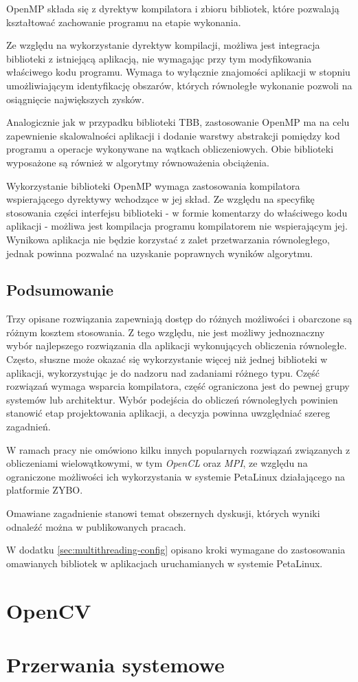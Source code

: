 OpenMP składa się z dyrektyw kompilatora i zbioru bibliotek, które pozwalają kształtować zachowanie programu na etapie wykonania.

Ze względu na wykorzystanie dyrektyw kompilacji, możliwa jest integracja biblioteki z istniejącą aplikacją, nie wymagając przy tym modyfikowania właściwego kodu programu. Wymaga to wyłącznie znajomości aplikacji w stopniu umożliwiającym identyfikację obszarów, których równoległe wykonanie pozwoli na osiągnięcie największych zysków.

Analogicznie jak w przypadku biblioteki TBB, zastosowanie OpenMP ma na celu zapewnienie skalowalności aplikacji i dodanie warstwy abstrakcji pomiędzy kod programu a operacje wykonywane na wątkach obliczeniowych. Obie biblioteki wyposażone są również w algorytmy równoważenia obciążenia.

Wykorzystanie biblioteki OpenMP wymaga zastosowania kompilatora wspierającego dyrektywy wchodzące w jej skład. Ze względu na specyfikę stosowania części interfejsu biblioteki - w formie komentarzy do właściwego kodu aplikacji - możliwa jest kompilacja programu kompilatorem nie wspierającym jej. Wynikowa aplikacja nie będzie korzystać z zalet przetwarzania równoległego, jednak powinna pozwalać na uzyskanie poprawnych wyników algorytmu.

\subsection*{Podsumowanie}
Trzy opisane rozwiązania zapewniają dostęp do różnych możliwości i obarczone są różnym kosztem stosowania. Z tego względu, nie jest możliwy jednoznaczny wybór najlepszego rozwiązania dla aplikacji wykonujących obliczenia równoległe. Często, słuszne może okazać się wykorzystanie więcej niż jednej biblioteki w aplikacji, wykorzystując je do nadzoru nad zadaniami różnego typu. 
Część rozwiązań wymaga wsparcia kompilatora, część ograniczona jest do pewnej grupy systemów lub architektur. Wybór podejścia do obliczeń równoległych powinien stanowić etap projektowania aplikacji, a decyzja powinna uwzględniać szereg zagadnień.

W ramach pracy nie omówiono kilku innych popularnych rozwiązań związanych z obliczeniami wielowątkowymi, w tym \emph{OpenCL} oraz \emph{MPI}, ze względu na ograniczone możliwości ich wykorzystania w systemie PetaLinux działającego na platformie ZYBO.

Omawiane zagadnienie stanowi temat obszernych dyskusji, których wyniki odnaleźć można w publikowanych pracach.\cite{choosing-thread-framework,Kegel2009}

W dodatku \ref{sec:multithreading-config} opisano kroki wymagane do zastosowania omawianych bibliotek w aplikacjach uruchamianych w systemie PetaLinux.
\section{OpenCV}
\label{sec:opencv}

\section{Przerwania systemowe}
\label{sec:axi-interrupts}